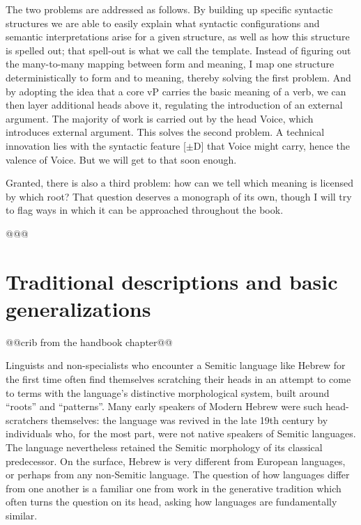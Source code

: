 The two problems are addressed as follows. By building up specific syntactic structures we are able to easily explain what syntactic configurations and semantic interpretations arise for a given structure, as well as how this structure is spelled out; that spell-out is what we call the template. Instead of figuring out the many-to-many mapping between form and meaning, I map one structure deterministically to form and to meaning, thereby solving the first problem. And by adopting the idea that a core vP carries the basic meaning of a verb, we can then layer additional heads above it, regulating the introduction of an external argument. The majority of work is carried out by the head Voice, which introduces external argument. This solves the second problem. A technical innovation lies with the syntactic feature [$\pm$D] that Voice might carry, hence the valence of Voice. But we will get to that soon enough.

Granted, there is also a third problem: how can we tell which meaning is licensed by which root? That question deserves a monograph of its own, though I will try to flag ways in which it can be approached throughout the book.

@@@
\section{Traditional descriptions and basic generalizations} \label{intro:basic}
@@crib from the handbook chapter@@


Linguists and non-specialists who encounter a Semitic language like Hebrew for the first time often find themselves scratching their heads in an attempt to come to terms with the language's distinctive morphological system, built around ``roots'' and ``patterns''. Many early speakers of Modern Hebrew were such head-scratchers themselves: the language was revived in the late 19th century by individuals who, for the most part, were not native speakers of Semitic languages. The language nevertheless retained the Semitic morphology of its classical predecessor. On the surface, Hebrew is very different from European languages, or perhaps from any non-Semitic language. The question of how languages differ from one another is a familiar one from work in the generative tradition which often turns the question on its head, asking how languages are fundamentally similar.


